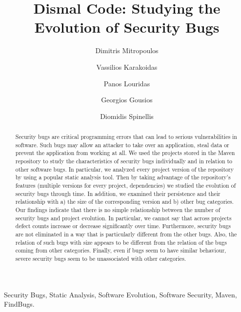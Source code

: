 \documentclass[conference]{llncs}
\begin{document}
\title{Dismal Code: Studying the Evolution of Security Bugs}

\author{Dimitris Mitropoulos \and Vassilios Karakoidas \and Panos Louridas \and Georgios Gousios \and Diomidis Spinellis }

\maketitle

\begin{abstract}
Security bugs are critical programming errors that can lead to serious
vulnerabilities in software. Such bugs may allow an attacker to take over
an application, steal data or prevent the application from working at all.
We used the projects stored in the Maven repository to study the
characteristics of security bugs individually and in relation to other software
bugs. In particular, we analyzed every project version of the repository by using a
popular static analysis tool. Then by taking advantage of
the repository's features (multiple versions for every project, dependencies) we studied
the evolution of security bugs through time. In addition, we examined
their persistence and their relationship with a) the
size of the corresponding version and b) other bug categories. Our findings
indicate that there is no simple relationship between the number of
security bugs and project evolution. In particular, we
cannot say that across projects defect counts increase or decrease
significantly over time. Furthermore, security bugs are not eliminated in a
way that is particularly different from the other bugs. Also, the relation of
such bugs with size appears to be different from the relation of the bugs
coming from other categories. Finally, even if bugs seem to have similar behaviour,
severe security bugs seem to be unassociated with other categories.
\end{abstract}

\begin{keywords}
Security Bugs, Static Analysis, Software Evolution, Software
Security, Maven, FindBugs.
\end{keywords}
\end{document}
